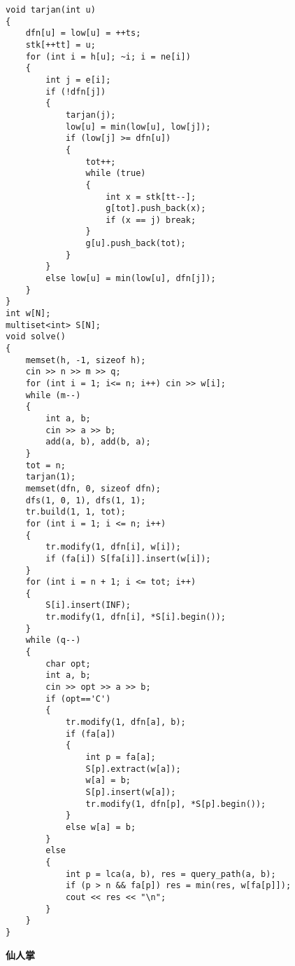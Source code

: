 \documentclass[a4paper, fontset=none]{ctexart}
\begin{document}
\begin{verbatim}
void tarjan(int u)
{
    dfn[u] = low[u] = ++ts;
    stk[++tt] = u;
    for (int i = h[u]; ~i; i = ne[i])
    {
        int j = e[i];
        if (!dfn[j])
        {
            tarjan(j);
            low[u] = min(low[u], low[j]);
            if (low[j] >= dfn[u])
            {
                tot++;
                while (true)
                {
                    int x = stk[tt--];
                    g[tot].push_back(x);
                    if (x == j) break;
                }
                g[u].push_back(tot);
            }
        }
        else low[u] = min(low[u], dfn[j]);
    }
}
int w[N];
multiset<int> S[N];
void solve()
{
    memset(h, -1, sizeof h);
    cin >> n >> m >> q;
    for (int i = 1; i<= n; i++) cin >> w[i];
    while (m--)
    {
        int a, b;
        cin >> a >> b;
        add(a, b), add(b, a);
    }
    tot = n;
    tarjan(1);
    memset(dfn, 0, sizeof dfn);
    dfs(1, 0, 1), dfs(1, 1);
    tr.build(1, 1, tot);
    for (int i = 1; i <= n; i++)
    {
        tr.modify(1, dfn[i], w[i]);
        if (fa[i]) S[fa[i]].insert(w[i]);
    }
    for (int i = n + 1; i <= tot; i++)
    {
        S[i].insert(INF);
        tr.modify(1, dfn[i], *S[i].begin());
    }
    while (q--)
    {
        char opt;
        int a, b;
        cin >> opt >> a >> b;
        if (opt=='C')
        {
            tr.modify(1, dfn[a], b);
            if (fa[a])
            {
                int p = fa[a];
                S[p].extract(w[a]);
                w[a] = b;
                S[p].insert(w[a]);
                tr.modify(1, dfn[p], *S[p].begin());
            }
            else w[a] = b;
        }
        else
        {
            int p = lca(a, b), res = query_path(a, b);
            if (p > n && fa[p]) res = min(res, w[fa[p]]);
            cout << res << "\n";
        }
    }
}
\end{verbatim}

\textbf{仙人掌}
\end{document}
